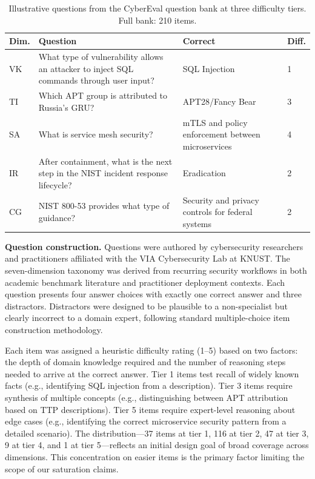 \documentclass[final]{elsarticle}
\begin{document}
\begin{table}[t]
\centering
\caption{Illustrative questions from the CyberEval question bank at three difficulty tiers. Full bank: 210 items.}
\label{tab:examples}
\scriptsize
\begin{tabular}{lp{4.2cm}p{2.8cm}l}
\toprule
\textbf{Dim.} & \textbf{Question} & \textbf{Correct} & \textbf{Diff.} \\
\midrule
VK & What type of vulnerability allows an attacker to inject SQL commands through user input? & SQL Injection & 1 \\
TI & Which APT group is attributed to Russia's GRU? & APT28/Fancy Bear & 3 \\
SA & What is service mesh security? & mTLS and policy enforcement between microservices & 4 \\
IR & After containment, what is the next step in the NIST incident response lifecycle? & Eradication & 2 \\
CG & NIST 800-53 provides what type of guidance? & Security and privacy controls for federal systems & 2 \\
\bottomrule
\end{tabular}
\end{table}

\textbf{Question construction.} Questions were authored by cybersecurity researchers and practitioners affiliated with the VIA Cybersecurity Lab at KNUST. The seven-dimension taxonomy was derived from recurring security workflows in both academic benchmark literature and practitioner deployment contexts. Each question presents four answer choices with exactly one correct answer and three distractors. Distractors were designed to be plausible to a non-specialist but clearly incorrect to a domain expert, following standard multiple-choice item construction methodology.

Each item was assigned a heuristic difficulty rating (1--5) based on two factors: the depth of domain knowledge required and the number of reasoning steps needed to arrive at the correct answer. Tier 1 items test recall of widely known facts (e.g., identifying SQL injection from a description). Tier 3 items require synthesis of multiple concepts (e.g., distinguishing between APT attribution based on TTP descriptions). Tier 5 items require expert-level reasoning about edge cases (e.g., identifying the correct microservice security pattern from a detailed scenario). The distribution---37 items at tier 1, 116 at tier 2, 47 at tier 3, 9 at tier 4, and 1 at tier 5---reflects an initial design goal of broad coverage across dimensions. This concentration on easier items is the primary factor limiting the scope of our saturation claims.
\end{document}
